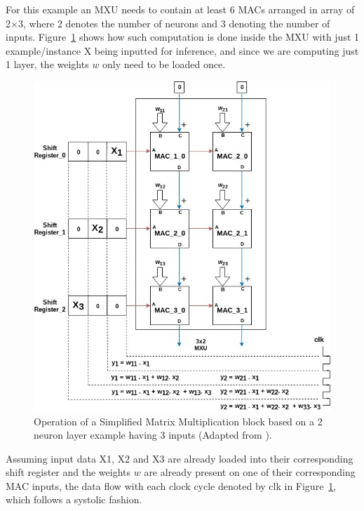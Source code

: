 For this example an MXU needs to contain at least 6 MACs arranged in array of 2$\times$3, where 2 denotes the number of neurons and 3 denoting the number of inputs. Figure~\ref{fig:mxu} shows how such computation is done inside the MXU with just 1 example/instance X being inputted for inference, and since we are computing just 1 layer, the weights $w$ only need to be loaded once. 

\begin{figure}
  \includegraphics{graphics/tensor_processing_unit/tensor_processing_unit_mxu.jpg}
  \caption{
    Operation of a Simplified Matrix Multiplication block based on a 2 neuron layer example having 3 inputs (Adapted from \citep{sato}). 
  }
  \label{fig:mxu}
\end{figure}

Assuming input data X1, X2 and X3 are already loaded into their corresponding shift register and the weights $w$ are already present on one of their corresponding MAC inputs, the data flow with each clock cycle denoted by clk in Figure~\ref{fig:mxu}, which follows a systolic fashion. 

